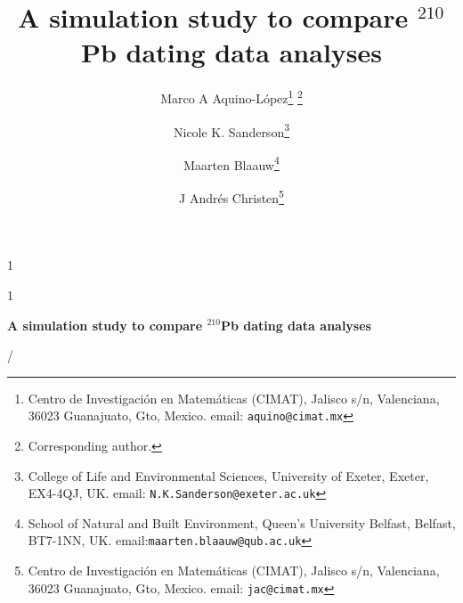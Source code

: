 \documentclass [10pt] {article}
\date{ }
\newcommand{\ac}{\color{red} }  %
\newcommand{\ca}{\color{black}} %
\newcommand{\blind}{1}
\newcommand{\papertitle}{
\ac A simulation study to compare $^{210}$Pb dating data analyses \ca}
\begin{document}
	\def\spacingset#1{\renewcommand{\baselinestretch}%
		{#1}\small\normalsize} \spacingset{1}
	\blind
	{
		\title{\textbf{\papertitle}}

		\author{Marco A Aquino-L\'opez\thanks{
				Centro de Investigaci\'on en Matem\'aticas (CIMAT),
				Jalisco s/n, Valenciana, 36023 Guanajuato, Gto, Mexico.
				email: \texttt{aquino@cimat.mx} } \thanks{Corresponding author.}
					\and
			Nicole K. Sanderson\thanks{
				College of Life and Environmental Sciences, University of Exeter,
				Exeter, EX4-4QJ, UK.
				email: \texttt{N.K.Sanderson@exeter.ac.uk}}
					\and
			Maarten Blaauw\thanks{School of Natural and Built Environment,
				Queen's University Belfast,
				Belfast, BT7-1NN, UK.
				email:\texttt{maarten.blaauw@qub.ac.uk}  }
					\and
			J Andr\'es Christen\thanks{
				Centro de Investigaci\'on en Matem\'aticas (CIMAT),
				Jalisco s/n, Valenciana, 36023 Guanajuato, Gto, Mexico.
				email: \texttt{jac@cimat.mx}  }
			}
		\maketitle
	} \fi

	\blind
	{
		\bigskip
		\bigskip
		\bigskip
		\begin{center}
			{\LARGE\bf \papertitle}
		\end{center}
		\medskip/
	} \fi
\end{document}
